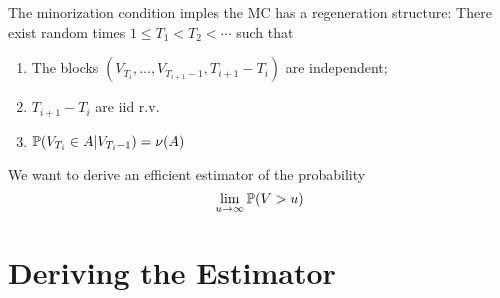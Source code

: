 \documentclass{beamer}
\begin{document}
\begin{frame}
  The minorization condition imples the MC has a regeneration
  structure: There exist random times $1 \leq T_1 < T_2 < \cdots$ such
  that
  \begin{enumerate}
  \item The blocks $(V_{T_i}, \dots, V_{T_{i+1} - 1}, T_{i+1} -
    T_{i})$ are independent;
  \item $T_{i+1} - T_{i}$ are iid r.v.
  \item $\P(V_{T_i} \in A | V_{T_{i}-1}) = \nu(A)$
  \end{enumerate}
  
\end{frame}

\begin{frame}
  We want to derive an efficient estimator of the probability
  \[
  \lim_{u \to \infty} \P(V > u)
  \]
\end{frame}


\section{Deriving the Estimator}


\end{document}
